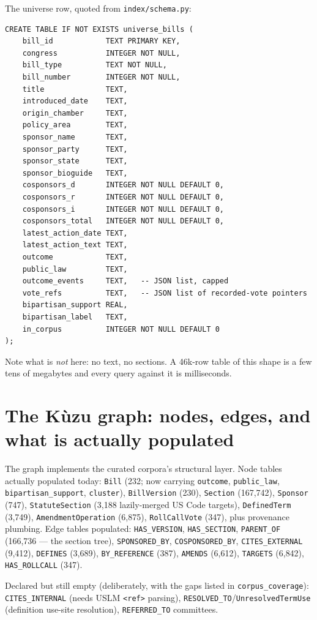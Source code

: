 \documentclass[11pt]{article}
\newcommand{\file}[1]{\texttt{#1}}
\newcommand{\code}[1]{\texttt{#1}}
\begin{document}
The universe row, quoted from \file{index/schema.py}:

\begin{lstlisting}[style=sql]
CREATE TABLE IF NOT EXISTS universe_bills (
    bill_id            TEXT PRIMARY KEY,
    congress           INTEGER NOT NULL,
    bill_type          TEXT NOT NULL,
    bill_number        INTEGER NOT NULL,
    title              TEXT,
    introduced_date    TEXT,
    origin_chamber     TEXT,
    policy_area        TEXT,
    sponsor_name       TEXT,
    sponsor_party      TEXT,
    sponsor_state      TEXT,
    sponsor_bioguide   TEXT,
    cosponsors_d       INTEGER NOT NULL DEFAULT 0,
    cosponsors_r       INTEGER NOT NULL DEFAULT 0,
    cosponsors_i       INTEGER NOT NULL DEFAULT 0,
    cosponsors_total   INTEGER NOT NULL DEFAULT 0,
    latest_action_date TEXT,
    latest_action_text TEXT,
    outcome            TEXT,
    public_law         TEXT,
    outcome_events     TEXT,   -- JSON list, capped
    vote_refs          TEXT,   -- JSON list of recorded-vote pointers
    bipartisan_support REAL,
    bipartisan_label   TEXT,
    in_corpus          INTEGER NOT NULL DEFAULT 0
);
\end{lstlisting}

Note what is \emph{not} here: no text, no sections. A 46k-row table of this
shape is a few tens of megabytes and every query against it is milliseconds.

\section{The K\`uzu graph: nodes, edges, and what is actually populated}
\label{sec:kuzu}

The graph implements the curated corpora's structural layer. Node tables
actually populated today: \code{Bill} (232; now carrying \code{outcome},
\code{public\_law}, \code{bipartisan\_support}, \code{cluster}),
\code{BillVersion} (230), \code{Section} (167{,}742), \code{Sponsor} (747),
\code{StatuteSection} (3{,}188 lazily-merged US Code targets),
\code{DefinedTerm} (3{,}749), \code{AmendmentOperation} (6{,}875),
\code{RollCallVote} (347), plus provenance plumbing. Edge tables populated:
\code{HAS\_VERSION}, \code{HAS\_SECTION}, \code{PARENT\_OF} (166{,}736 ---
the section tree), \code{SPONSORED\_BY}, \code{COSPONSORED\_BY},
\code{CITES\_EXTERNAL} (9{,}412), \code{DEFINES} (3{,}689),
\code{BY\_REFERENCE} (387), \code{AMENDS} (6{,}612), \code{TARGETS}
(6{,}842), \code{HAS\_ROLLCALL} (347).

Declared but still empty (deliberately, with the gaps listed in
\code{corpus\_coverage}): \code{CITES\_INTERNAL} (needs USLM
\code{<ref>} parsing), \code{RESOLVED\_TO}/\code{UnresolvedTermUse}
(definition use-site resolution), \code{REFERRED\_TO} committees.
\end{document}
